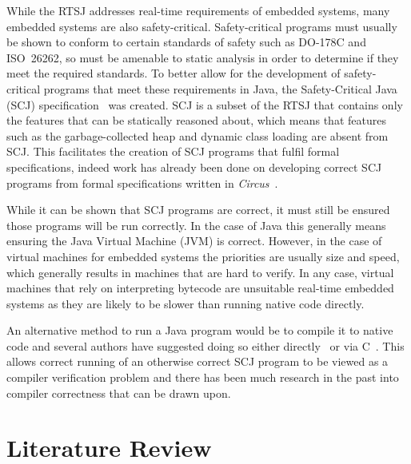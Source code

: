\documentclass[a4paper,12pt]{article}
\newcommand{\Circus}{{\sffamily \slshape Circus}}
\begin{document}
While the RTSJ addresses real-time requirements of embedded systems, many embedded systems are also safety-critical.
Safety-critical programs must usually be shown to conform to certain standards of safety such as \mbox{DO-178C} and ISO~26262, so must be amenable to static analysis in order to determine if they meet the required standards.
To better allow for the development of safety-critical programs that meet these requirements in Java, the Safety-Critical Java (SCJ) specification~\cite{locke2013} was created.
SCJ is a subset of the RTSJ that contains only the features that can be statically reasoned about, which means that features such as the garbage-collected heap and dynamic class loading are absent from SCJ.
This facilitates the creation of SCJ programs that fulfil formal specifications, indeed work has already been done on developing correct SCJ programs from formal specifications written in \Circus~\cite{cavalcanti2011, cavalcanti2013}.

While it can be shown that SCJ programs are correct, it must still be ensured those programs will be run correctly.
In the case of Java this generally means ensuring the Java Virtual Machine (JVM) is correct.
However, in the case of virtual machines for embedded systems the priorities are usually size and speed, which generally results in machines that are hard to verify.
In any case, virtual machines that rely on interpreting bytecode are unsuitable real-time embedded systems as they are likely to be slower than running native code directly.

An alternative method to run a Java program would be to compile it to native code and several authors have suggested doing so either directly~\cite{schultz2003} or via C~\cite{varma2004, korsholm2014}.
This allows correct running of an otherwise correct SCJ program to be viewed as a compiler verification problem and there has been much research in the past into compiler correctness that can be drawn upon.


\section{Literature Review}
\end{document}
